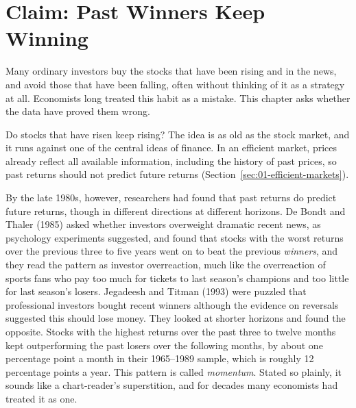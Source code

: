 \makeatletter
{}
\makeatother

\chapter{Claim: Past Winners Keep Winning}
\label{ch:04}
\providecommand{\term}[1]{\emph{#1}}

Many ordinary investors buy the stocks that have been rising and in the news, and avoid those that have been falling, often without thinking of it as a strategy at all. Economists long treated this habit as a mistake. This chapter asks whether the data have proved them wrong.

Do stocks that have risen keep rising? The idea is as old as the stock market, and it runs against one of the central ideas of finance. In an efficient market, prices already reflect all available information, including the history of past prices, so past returns should not predict future returns (Section~\ref{sec:01-efficient-markets}). 

By the late 1980s, however, researchers had found that past returns do predict future returns, though in different directions at different horizons. De Bondt and Thaler (1985) asked whether investors overweight dramatic recent news, as psychology experiments suggested, and found that stocks with the worst returns over the previous three to five years went on to beat the previous \term{winners}, and they read the pattern as investor overreaction, much like the overreaction of sports fans who pay too much for tickets to last season's champions and too little for last season's losers. Jegadeesh and Titman (1993) were puzzled that professional investors bought recent winners although the evidence on reversals suggested this should lose money. They looked at shorter horizons and found the opposite. Stocks with the highest returns over the past three to twelve months kept outperforming the past losers over the following months, by about one percentage point a month in their 1965--1989 sample, which is roughly 12 percentage points a year. This pattern is called \term{momentum}. Stated so plainly, it sounds like a chart-reader's superstition, and for decades many economists had treated it as one.

